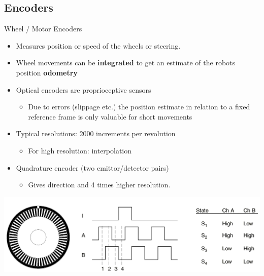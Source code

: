 \documentclass[compress]{beamer}
\begin{document}
\subsection{Encoders}
\begin{frame}{Wheel / Motor Encoders}

    \footnotesize
    \begin{itemize}
        \item Measures position or speed of the wheels or steering.

        \item Wheel movements can be \textbf{integrated} to get an estimate of the robots
            position \rightarrow \textbf{odometry}

        \item Optical encoders are proprioceptive sensors
              \begin{itemize}
                  \item \footnotesize Due to errors (slippage etc.) the position estimate in relation to a
                        fixed reference frame is only valuable for short movements
              \end{itemize}

        \item Typical resolutions: 2000 increments per revolution
              \begin{itemize}
                  \item \footnotesize For high resolution: interpolation
              \end{itemize}

        \item Quadrature encoder (two emittor/detector pairs)
              \begin{itemize}
                  \item \footnotesize Gives direction and 4 times higher resolution.
              \end{itemize}
    \end{itemize}

    \begin{center}
        \includegraphics[width=0.9\linewidth]{encoders1}
    \end{center}

\end{frame}
\end{document}
